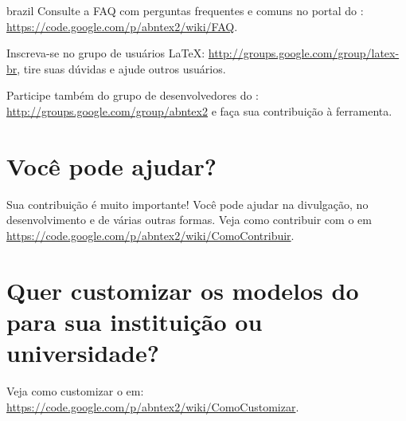 \begin{otherlanguage*}{brazil}
Consulte a FAQ com perguntas frequentes e comuns no portal do \abnTeX{}:
\url{https://code.google.com/p/abntex2/wiki/FAQ}.

Inscreva-se no grupo de usuários \LaTeX{}:
\url{http://groups.google.com/group/latex-br}, tire suas dúvidas e ajude
outros usuários.

Participe também do grupo de desenvolvedores do \abnTeX{}:
\url{http://groups.google.com/group/abntex2} e faça sua contribuição à
ferramenta.

\section{Você pode ajudar?}

Sua contribuição é muito importante! Você pode ajudar na divulgação, no
desenvolvimento e de várias outras formas. Veja como contribuir com o \abnTeX{}
em \url{https://code.google.com/p/abntex2/wiki/ComoContribuir}.

%
%
\section{Quer customizar os modelos do \texorpdfstring{\newline}{}\abnTeX{} para sua instituição ou
universidade?}

Veja como customizar o \abnTeX{} em:
\url{https://code.google.com/p/abntex2/wiki/ComoCustomizar}.



\end{otherlanguage*}


